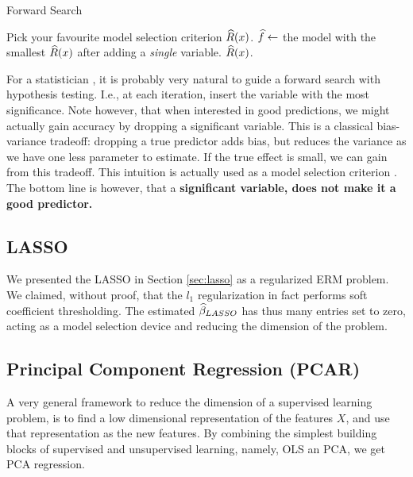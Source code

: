 \begin{algorithm}[H]
\caption{Forward Search}
\begin{algorithmic}
\State Pick your favourite model selection criterion $\widehat{R}(x)$.
    \State $\widehat{f} \gets$ the model with the smallest $\widehat{R}(x)$ after adding a \emph{single} variable.
\EndWhile
\State \Return $\widehat{R}(x)$.
\end{algorithmic}
\end{algorithm}



\begin{remark}
For a statistician , it is probably very natural to guide a forward search with hypothesis testing. I.e., at each iteration, insert the variable with the most significance. 
Note however, that when interested in good predictions, we might actually gain accuracy by dropping a significant variable. This is a classical bias-variance tradeoff: dropping a true predictor adds bias, but reduces the variance as we have one less parameter to estimate. If the true effect is small, we can gain from this tradeoff. 
This intuition is actually used as a model selection criterion \citep{foster_variable_2004}.
The bottom line is however, that a \textbf{significant variable, does not make it a good predictor.} 
\end{remark}



\subsection{LASSO}
We presented the LASSO in Section \ref{sec:lasso} as a regularized ERM problem.
We claimed, without proof, that the $l_1$ regularization in fact performs soft coefficient thresholding. 
The estimated $\widehat{\beta}_{LASSO}$ has thus many entries set to zero, acting as a model selection device and reducing the dimension of the problem.





\subsection{Principal Component Regression (PCAR)}
\label{sec:pca_regression}

A very general framework to reduce the dimension of a supervised learning problem, is to find a low dimensional representation of the features $X$, and use that representation as the new features.
By combining the simplest building blocks of supervised and unsupervised learning, namely, OLS an PCA, we get PCA regression.

